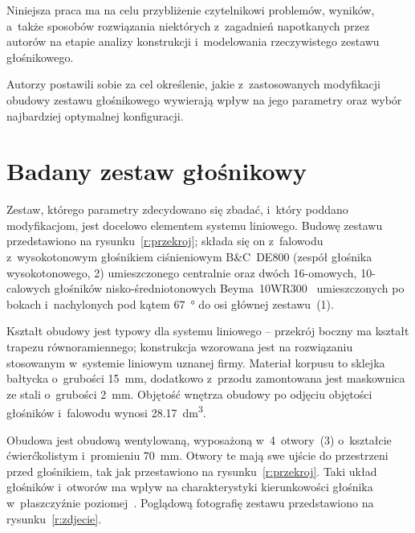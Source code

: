\documentclass[12pt]{oska}
\newcommand{\comment}[1]{{\color{magenta}\emph{\textbf{#1}}}}
\begin{document}
	Niniejsza praca ma na celu przybliżenie czytelnikowi problemów, wyników, a~także sposobów rozwiązania niektórych z~zagadnień napotkanych przez autorów na etapie analizy konstrukcji i~modelowania rzeczywistego zestawu głośnikowego.
	
	Autorzy postawili sobie za cel określenie, jakie z~zastosowanych modyfikacji obudowy zestawu głośnikowego wywierają wpływ na jego parametry oraz wybór najbardziej optymalnej konfiguracji.
	
	
	
	\section{Badany zestaw głośnikowy}\label{ss:opis}
	
	
	Zestaw, którego parametry zdecydowano się zbadać, i~który poddano modyfikacjom, jest docelowo elementem systemu liniowego. Budowę zestawu przedstawiono na rysunku~\ref{r:przekroj}; składa się on z~falowodu z~wysokotonowym głośnikiem ciśnieniowym B\&C~DE800 (zespół głośnika wysokotonowego, 2) umieszczonego centralnie oraz dwóch 16-omowych, 10-calowych głośników nisko-średniotonowych Beyma~10WR300~\cite{datasheet} umieszczonych po bokach i~nachylonych pod kątem \SI{67}{\degree} do osi głównej zestawu~(1).
	
	Kształt obudowy jest typowy dla systemu liniowego -- przekrój boczny ma kształt trapezu równoramiennego; konstrukcja wzorowana jest na rozwiązaniu stosowanym w~systemie liniowym uznanej firmy. Materiał korpusu to sklejka bałtycka o~grubości \SI{15}{\milli\metre}, dodatkowo z~przodu zamontowana jest maskownica ze stali o~grubości \SI{2}{\milli\metre}. Objętość wnętrza obudowy po odjęciu objętości głośników i~falowodu wynosi \SI{28,17}{\deci\metre\cubed}.
	
	Obudowa jest obudową wentylowaną, wyposażoną w~4~otwory~(3) o~kształcie ćwierćkolistym i~promieniu \SI{70}{\milli\metre}. Otwory te mają swe ujście do przestrzeni przed głośnikiem, tak jak przestawiono na rysunku~\ref{r:przekroj}. %
	Taki układ głośników i~otworów ma wpływ na charakterystyki kierunkowości głośnika w~płaszczyźnie poziomej~\cite{kmiecik_inz}. Poglądową fotografię zestawu przedstawiono na rysunku~\ref{r:zdjecie}. %
	
\end{document}
